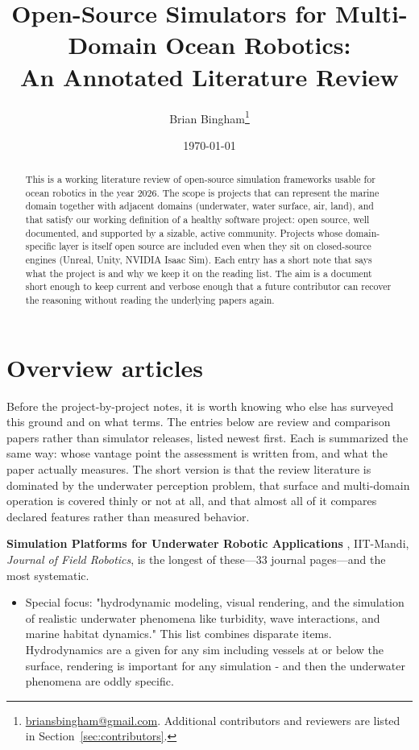 \documentclass[11pt]{article}
\title{Open-Source Simulators for Multi-Domain Ocean Robotics:\\ An Annotated Literature Review}
\author{Brian Bingham\thanks{\href{mailto:briansbingham@gmail.com}{briansbingham@gmail.com}. Additional contributors and reviewers are listed in Section~\ref{sec:contributors}.}}
\date{\today}
\begin{document}
\maketitle

\begin{abstract}
This is a working literature review of open-source simulation frameworks usable for ocean robotics in the year 2026. The scope is projects that can represent the marine domain together with adjacent domains (underwater, water surface, air, land), and that satisfy our working definition of a healthy software project: open source, well documented, and supported by a sizable, active community. Projects whose domain-specific layer is itself open source are included even when they sit on closed-source engines (Unreal, Unity, NVIDIA Isaac Sim). Each entry has a short note that says what the project is and why we keep it on the reading list. The aim is a document short enough to keep current and verbose enough that a future contributor can recover the reasoning without reading the underlying papers again.
\end{abstract}

\section{Overview articles}
\label{sec:overviews}

Before the project-by-project notes, it is worth knowing who else has surveyed this ground and on what terms. The entries below are review and comparison papers rather than simulator releases, listed newest first. Each is summarized the same way: whose vantage point the assessment is written from, and what the paper actually measures. The short version is that the review literature is dominated by the underwater perception problem, that surface and multi-domain operation is covered thinly or not at all, and that almost all of it compares declared features rather than measured behavior.

\textbf{Simulation Platforms for Underwater Robotic Applications} \autocite{shaw2026simplatforms}, IIT-Mandi, \emph{Journal of Field Robotics}, is the longest of these---33 journal pages---and the most systematic. 
\begin{itemize}
\item Special focus: "hydrodynamic modeling, visual rendering, and the simulation of realistic underwater phenomena like turbidity, wave interactions, and marine habitat dynamics."   This list combines disparate items.  Hydrodynamics are a given for any sim including vessels at or below the surface, rendering is important for any simulation - and then the underwater phenomena are  oddly specific.  
\end{itemize}
\end{document}
